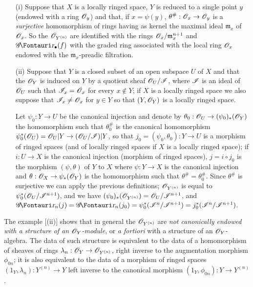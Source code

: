 \begin{examples}[16.1.3]
\label{IV.16.1.3}
\medskip\noindent
\begin{enumerate}
  \item[(i)] Suppose that $X$ is a locally ringed space, $Y$ is reduced to a single point $y$ (endowed with a ring $\mathscr{O}_y$) and that, if $x = \psi(y)$, $\theta^\#:\sh{O}_x \to \sh{O}_y$ is a \emph{surjective} homomorphism of rings having as kernel the maximal ideal $\mathfrak{m}_x$ of $\mathscr{O}_x$.
  So the $\mathscr{O}_{Y^{(n)}}$ are identified with the rings $\mathscr{O}_x/\mathfrak{m}_x^{n+1}$ and $\shGr_\bullet(f)$ with the graded ring associated with the local ring $\mathscr{O}_x$ endowed with the $\mathfrak{m}_x$-preadic filtration.
  \item[(ii)] Suppose that $Y$ is a closed subset of an open subspace $U$ of $X$ and that the $\mathscr{O}_Y$ is induced on $Y$ by a quotient sheaf $\mathscr{O}_U/\mathscr{I}$, where $\mathscr{I}$ is an ideal of $\mathscr{O}_U$ such that $\mathscr{I}_x = \mathscr{O}_x$ for every $x \not\in Y$;
  if $X$ is a locally ringed space we also suppose that $\mathscr{I}_x \neq \mathscr{O}_x$ for $y \in Y$ so that $(Y, \mathscr{O}_Y)$ is a locally ringed space.
  
  Let $\psi_0: Y \to U$ be the canonical injection and denote by $\theta_0: \sh{O}_U \to (\psi_0)_*(\sh{O}_Y)$ the homomorphism such that $\theta_0^\#$ is the canonical homomorphism $\psi^*_0(\sh{O}_U) = \sh{O}_U|Y \to (\sh{O}_U/\sh{I})|Y$, so that $j_0=(\psi_0, \theta_0):Y \to U$ is a morphism of ringed spaces (and of locally ringed spaces if $X$ is a locally ringed space);
  if $i:U \to X$ is the canonical injection (morphism of ringed spaces), $j = i\circ j_0$ is the morphism $(\psi, \theta)$ of $Y$ to $X$ where $\psi: Y \to X$ is the canonical injection and $\theta:\sh{O}_X \to \psi_*(\sh{O}_Y)$ is the homomorphism such that $\theta^\# = \theta_0^\#$.
  Since $\theta^\#$ is surjective we can apply the previous definitions;
  $\mathscr{O}_{Y^{(n)}}$ is equal to $\psi^*_0(\mathscr{O}_U/\mathscr{I}^{n+1})$, and we have $(\psi_0)_*(\mathscr{O}_{Y^{(n)}} ) = \mathscr{O}_U/\mathscr{I}^{n+1}$, and $\shGr_n(j) = \shGr_n(j_0) = \psi^*_0(\sh{I}^n/\sh{I}^{n+1}) = j^*_0(\sh{I}^n/\sh{I}^{n+1})$.
\end{enumerate}
\end{examples}

\begin{env}[16.1.4]
\label{IV.16.1.4}
The example [(ii)] shows that in general the $\mathscr{O}_{Y^{(n)}}$ are \emph{not canonically endowed with a structure of an $\mathscr{O}_Y$-module}, or \emph{a fortiori} with a structure of an $\mathscr{O}_Y$-algebra.
The data of such structure is equivalent to the data of a homomorphism of sheaves of rings $\lambda_n:\sh{O}_Y \to \sh{O}_{Y^{(n)}}$, right inverse to the augmentation morphism $\phi_{0n}$;
it is also equivalent to the data of a morphism of ringed spaces $(1_Y, \lambda_n): Y^{(n)} \to Y$ left inverse to the canonical morphism $(1_Y, \phi_{0n}): Y \to Y^{(n)}$.
\end{env}

